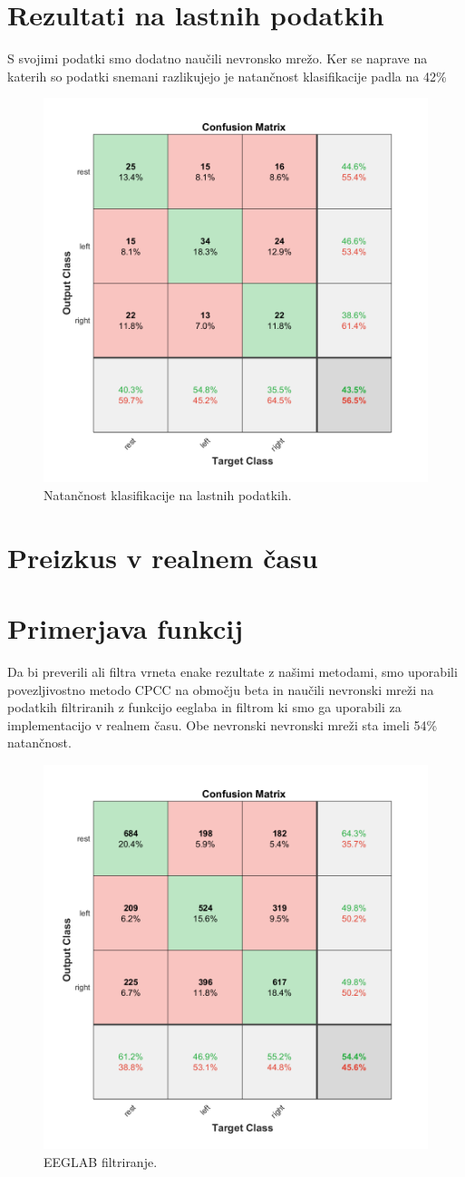 \section{Rezultati na lastnih podatkih}
S svojimi podatki smo dodatno naučili nevronsko mrežo. Ker se naprave na katerih so podatki snemani razlikujejo je natančnost klasifikacije padla na 42\%
\begin{figure}[h!]
\begin{center}
\includegraphics[width=0.5\linewidth]{slike/Confusion_13-20Hz_0s-4s_retrained.png}
\end{center}
\caption{Natančnost klasifikacije na lastnih podatkih.}
\end{figure}
\section{Preizkus v realnem času}

\section{Primerjava funkcij}
Da bi preverili ali filtra vrneta enake rezultate z našimi metodami, smo uporabili povezljivostno metodo CPCC na območju beta in naučili nevronski mreži na podatkih filtriranih z funkcijo eeglaba in filtrom ki smo ga uporabili za implementacijo v realnem času. Obe nevronski nevronski mreži sta imeli 54\% natančnost.
\begin{figure}[h!]
\begin{center}
\includegraphics[width=0.5\linewidth]{slike/Confusion_eeglab.png}
\end{center}
\caption{EEGLAB filtriranje.}
\end{figure}

